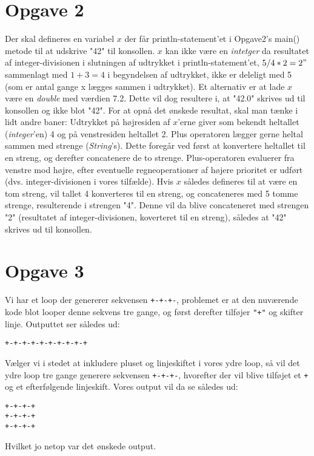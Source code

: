 \documentclass{scrartcl}
\newcommand\code[1]{\texttt{#1}}
\begin{document}
\section*{Opgave 2}
Der skal defineres en variabel $x$ der får println-statement'et i Opgave2's
main() metode til at udskrive "42" til konsollen.
$x$ kan ikke være en \emph{intetger} da resultatet af integer-divisionen i slutningen af
udtrykket i println-statement'et, $5/4*2=2"$ sammenlagt med $1+3=4$ i
begyndelsen af udtrykket, ikke er
deleligt med 5 (som er antal gange x lægges sammen i udtrykket).
Et alternativ er at lade $x$ være en \emph{double} med værdien 7.2. Dette vil
dog resultere i, at "42.0" skrives ud til konsollen og ikke blot "42".
For at opnå det ønskede resultat, skal man tænke i lidt andre baner: Udtrykket
på højresiden af $x$'erne giver som bekendt heltallet (\emph{integer}'en) 4 og
på venstresiden heltallet 2. Plus operatoren lægger gerne heltal sammen med
strenge (\emph{String}'s). Dette foregår ved først at konvertere heltallet til
en streng, og derefter concatenere de to strenge. Plus-operatoren evaluerer fra
venstre mod højre, efter eventuelle regneoperationer af højere prioritet er
udført (dvs. integer-divisionen i vores tilfælde). Hvis $x$ således defineres
til at være en tom streng, vil tallet 4 konverteres til en streng, og
concateneres med 5 tomme strenge, resulterende i strengen "4". Denne vil da
blive concateneret med strengen "2" (resultatet af integer-divisionen,
koverteret til en streng), således at "42" skrives ud til konsollen.

\section*{Opgave 3}
Vi har et loop der genererer sekvensen \code{+-+-+-}, problemet er at den nuværende kode blot looper denne sekvens tre gange, og først derefter tilføjer \code{"+"} og skifter linje. Outputtet ser således ud:
\begin{Verbatim}
+-+-+-+-+-+-+-+-+-+
\end{Verbatim}
Vælger vi i stedet at inkludere pluset og linjeskiftet i vores ydre loop, så vil det ydre loop tre gange generere sekvensen \code{+-+-+-}, hvorefter der vil blive tilføjet et \code{+} og et efterfølgende linjeskift.
Vores output vil da se således ud:
\begin{Verbatim}
+-+-+-+
+-+-+-+
+-+-+-+
\end{Verbatim}
Hvilket jo netop var det ønskede output.
\end{document}
